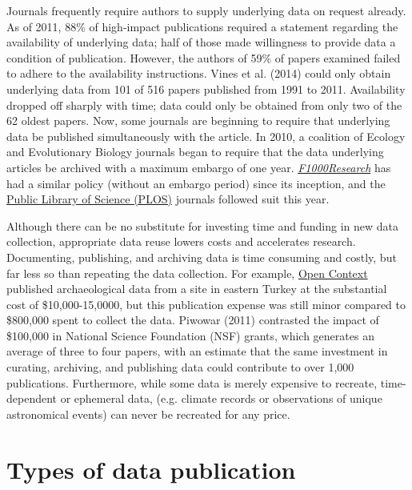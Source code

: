 \documentclass[10pt,twocolumn]{article}
\begin{document}
Journals frequently require authors to supply underlying data on request already.
As of 2011, 88\% of high-impact publications required a statement regarding the availability of underlying data; half of those made willingness to provide data a condition of publication.\cite{alsheikh-ali_public_2011}
However, the authors of 59\% of papers examined failed to adhere to the availability instructions.
Vines et al. (2014)\cite{vines_availability_2014} could only obtain underlying data from 101 of 516 papers published from 1991 to 2011.
Availability dropped off sharply with time; data could only be obtained from only two of the 62 oldest papers.
Now, some journals are beginning to require that underlying data be published simultaneously with the article.
In 2010, a coalition of Ecology and Evolutionary Biology journals began to require that the data underlying articles be archived with a maximum embargo of one year.\cite{whitlock_data_2010, fairbairn_advent_2010}
\href{http://f1000research.com}{\emph{F1000Research}} has had a similar policy (without an embargo period) since its inception, and the {\href{http://www.plos.org/}{Public Library of Science (PLOS)}} journals followed suit this year.\cite{bloom_data_2014}

Although there can be no substitute for investing time and funding in new data collection, appropriate data reuse lowers costs and accelerates research.
Documenting, publishing, and archiving data is time consuming and costly, but far less so than repeating the data collection.
For example, \href{http://opencontext.org/}{Open Context} published archaeological data from a site in eastern Turkey at the substantial cost of \$10,000-15,0000, but this publication expense was still minor compared to \$800,000 spent to collect the data\cite{kansa_we_2014}.
Piwowar (2011) contrasted the impact of \$100,000 in National Science Foundation (NSF) grants, which generates an average of three to four papers, with an estimate that the same investment in curating, archiving, and publishing data could contribute to over 1,000 publications.\cite{piwowar_data_2011}
Furthermore, while some data is merely expensive to recreate, time-dependent or ephemeral data, (e.g. climate records or observations of unique astronomical events) can never be recreated for any price.\cite{gray_online_2002}

\section*{Types of data publication}\label{types-of-data-publication}
\end{document}
